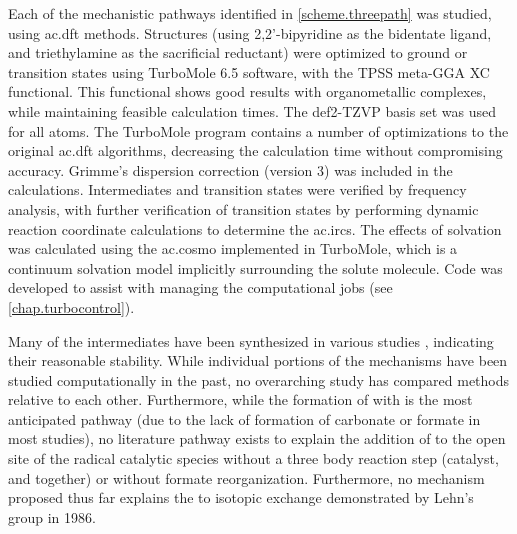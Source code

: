 Each of the mechanistic pathways identified in \autoref{scheme.threepath} was studied, using \gls{ac.dft} methods. Structures (using 2,2'-bipyridine as the bidentate ligand, and triethylamine as the sacrificial reductant) were optimized to ground or transition states using TurboMole 6.5 software\autocite{turbomole, ahlrichs1989}, with the TPSS meta-GGA XC functional\autocite{tao2003}. This functional shows good results with organometallic complexes, while maintaining feasible calculation times. The def2-TZVP basis set was used for all atoms\autocite{schafer1994, weigend2005}. The TurboMole program contains a number of optimizations to the original \gls{ac.dft} algorithms\autocite{haase1993, treutler1995, eichkorn1997, eichkorn1995, sierka2003, deglmann2004, weigend2002, vonarnim1998, ahlrichs2004}, decreasing the calculation time without compromising accuracy. Grimme's dispersion correction (version 3) was included in the calculations\autocite{grimme2010}. Intermediates and transition states were verified by frequency analysis\autocite{deglmann2004, deglmann2002, grimme2002}, with further verification of transition states by performing dynamic reaction coordinate calculations to determine the \glspl{ac.irc}. The effects of solvation was calculated using the \gls{ac.cosmo} implemented in TurboMole\autocite{klamt1993}, which is a continuum solvation model implicitly surrounding the solute molecule. Code was developed to assist with managing the computational jobs (see \autoref{chap.turbocontrol}).

Many of the intermediates have been synthesized in various studies \autocite{shaver1992, gibson1998, gibson1999, gibson2003}, indicating their reasonable stability. While individual portions of the mechanisms have been studied computationally in the past\autocite{agarwal2011, agarwal2012a, agarwal2012b}, no overarching study has compared methods relative to each other. Furthermore, while the formation of  with  is the most anticipated pathway (due to the lack of formation of carbonate or formate in most studies), no literature pathway exists to explain the addition of  to the open site of the radical catalytic species without a three body reaction step (catalyst,  and  together) or without formate reorganization. Furthermore, no mechanism proposed thus far explains the  to  isotopic exchange demonstrated by Lehn's group in 1986\autocite{hawecker1986}. 

